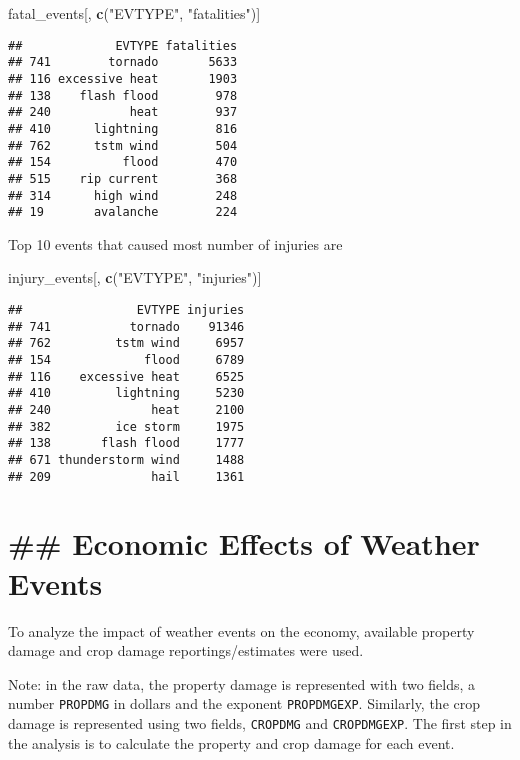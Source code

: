 \documentclass[]{article}
\newenvironment{Shaded}{\begin{snugshade}}{\end{snugshade}}
\newcommand{\KeywordTok}[1]{\textcolor[rgb]{0.13,0.29,0.53}{\textbf{#1}}}
\newcommand{\StringTok}[1]{\textcolor[rgb]{0.31,0.60,0.02}{#1}}
\newcommand{\NormalTok}[1]{#1}
\begin{document}
\begin{Shaded}
\begin{Highlighting}[]
\NormalTok{fatal_events[, }\KeywordTok{c}\NormalTok{(}\StringTok{"EVTYPE"}\NormalTok{, }\StringTok{"fatalities"}\NormalTok{)]}
\end{Highlighting}
\end{Shaded}

\begin{verbatim}
##             EVTYPE fatalities
## 741        tornado       5633
## 116 excessive heat       1903
## 138    flash flood        978
## 240           heat        937
## 410      lightning        816
## 762      tstm wind        504
## 154          flood        470
## 515    rip current        368
## 314      high wind        248
## 19       avalanche        224
\end{verbatim}

Top 10 events that caused most number of injuries are

\begin{Shaded}
\begin{Highlighting}[]
\NormalTok{injury_events[, }\KeywordTok{c}\NormalTok{(}\StringTok{"EVTYPE"}\NormalTok{, }\StringTok{"injuries"}\NormalTok{)]}
\end{Highlighting}
\end{Shaded}

\begin{verbatim}
##                EVTYPE injuries
## 741           tornado    91346
## 762         tstm wind     6957
## 154             flood     6789
## 116    excessive heat     6525
## 410         lightning     5230
## 240              heat     2100
## 382         ice storm     1975
## 138       flash flood     1777
## 671 thunderstorm wind     1488
## 209              hail     1361
\end{verbatim}

\section{\#\# Economic Effects of Weather
Events}\label{economic-effects-of-weather-events}

To analyze the impact of weather events on the economy, available
property damage and crop damage reportings/estimates were used.

Note: in the raw data, the property damage is represented with two
fields, a number \texttt{PROPDMG} in dollars and the exponent
\texttt{PROPDMGEXP}. Similarly, the crop damage is represented using two
fields, \texttt{CROPDMG} and \texttt{CROPDMGEXP}. The first step in the
analysis is to calculate the property and crop damage for each event.
\end{document}
